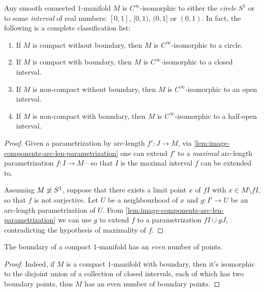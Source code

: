 \begin{theorem}
    \label{thm:classification-of-1-manifolds}
    Any smooth connected \(1\)-manifold \(M\) is \(C^{\infty}\)-isomorphic to either
    the \emph{circle} \(S^1\) or to some \emph{interval} of real numbers:
    \([0, 1]\), \([0, 1)\), \((0, 1]\) or \((0, 1)\). In fact, the following is a
    complete classification list:
    \begin{enumerate}[(1)]\setlength\itemsep{0em}
        \item If \(M\) is compact without boundary, then \(M\) is
              \(C^{\infty}\)-isomorphic to a circle.

        \item If \(M\) is compact with boundary, then \(M\) is \(C^{\infty}\)-isomorphic
              to a closed interval.

        \item If \(M\) is non-compact without boundary, then \(M\) is
              \(C^{\infty}\)-isomorphic to an open interval.

        \item If \(M\) is non-compact with boundary, then \(M\) is
              \(C^{\infty}\)-isomorphic to a half-open interval.
    \end{enumerate}
\end{theorem}

\begin{proof}
    Given a parametrization by arc-length \(f': J \to M\), via
    \cref{lem:image-components-arc-len-parametrization} one can extend \(f'\) to a
    \emph{maximal} arc-length parametrization \(f: I \to M\)---so that \(I\) is the
    maximal interval \(f\) can be extended to.

    Assuming \(M \not\simeq S^{1}\), suppose that there exists a limit point \(x\) of
    \(f I\) with \(x \in M \setminus f I\), so that \(f\) is not surjective. Let
    \(U\) be a neighbourhood of \(x\) and \(g: I' \to U\) be an arc-length
    parametrization of \(U\). From
    \cref{lem:image-components-arc-len-parametrization} we can use \(g\) to extend
    \(f\) to a parametrization \(f I \cup g J\), contradicting the hypothesis of
    maximality of \(f\).
\end{proof}

\begin{corollary}
    \label{cor:1-manifold-boundary-even-number-of-points}
    The boundary of a compact \(1\)-manifold has an \emph{even} number of points.
\end{corollary}

\begin{proof}
    Indeed, if \(M\) is a compact \(1\)-manifold with boundary, then it's
    isomorphic to the disjoint union of a collection of closed intervals, each of
    which has two boundary points, thus \(M\) has an even number of boundary points.
\end{proof}

